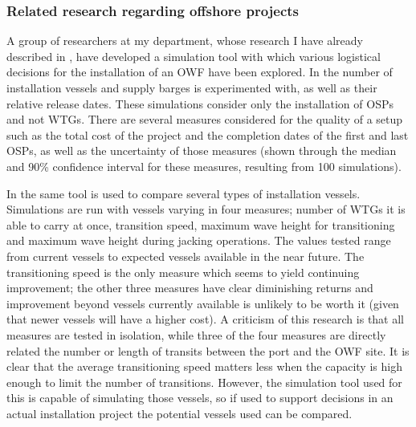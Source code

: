 \documentclass[a4paper,12pt]{article}
\begin{document}
\subsubsection{Related research regarding offshore projects} \label{sss:offsh}
A group of researchers at my department, whose research \cite{barlow2018mixed} I have already described in , have developed a simulation tool with which various logistical decisions for the installation of an OWF have been explored. In \cite{barlow2014support} the number of installation vessels and supply barges is experimented with, as well as their relative release dates. These simulations consider only the installation of OSPs and not WTGs. There are several measures considered for the quality of a setup such as the total cost of the project and the completion dates of the first and last OSPs, as well as the uncertainty of those measures (shown through the median and 90\% confidence interval for these measures, resulting from 100 simulations). 

In \cite{barlow2014assessment} the same tool is used to compare several types of installation vessels. Simulations are run with vessels varying in four measures; number of WTGs it is able to carry at once, transition speed, maximum wave height for transitioning and maximum wave height during jacking operations. The values tested range from current vessels to expected vessels available in the near future. The transitioning speed is the only measure which seems to yield continuing improvement; the other three measures have clear diminishing returns and improvement beyond vessels currently available is unlikely to be worth it (given that newer vessels will have a higher cost). A criticism of this research is that all measures are tested in isolation, while three of the four measures are directly related the number or length of transits between the port and the OWF site. It is clear that the average transitioning speed matters less when the capacity is high enough to limit the number of transitions. However, the simulation tool used for this is capable of simulating those vessels, so if used to support decisions in an actual installation project the potential vessels used can be compared. 
\end{document}

